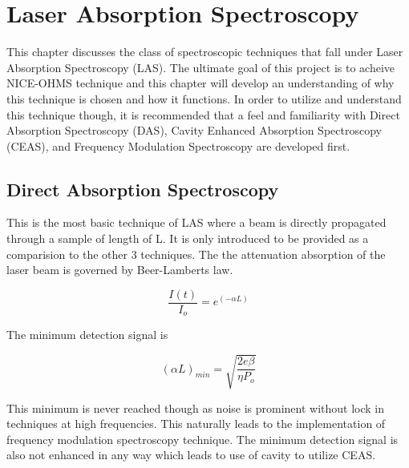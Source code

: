 \documentclass[11pt,a4paper]{book}
\begin{document}
\chapter{Laser Absorption Spectroscopy}
	\label{sec:Laser Absorption Spectroscopy}
	This chapter discusses the class of spectroscopic techniques that fall under Laser Absorption Spectroscopy (LAS). The ultimate goal of this project is to acheive NICE-OHMS technique and this chapter will develop an understanding of why this technique is chosen and how it functions. In order to utilize and understand this technique though, it is recommended that a feel and familiarity with Direct Absorption Spectroscopy (DAS), Cavity Enhanced Absorption Spectroscopy (CEAS), and Frequency Modulation Spectroscopy are developed first.	

	\section{Direct Absorption Spectroscopy}
	
	\label{sec:Direct Absorption Spectroscopy}
		This is the most basic technique of LAS where a beam is directly propagated through a sample of length of L. It is only introduced to be provided as a comparision to the other 3 techniques. The the attenuation absorption of the laser beam is governed by Beer-Lamberts law.

		\begin{equation}
			\label{eq:BeerLamberts}
			\dfrac{I(t)}{I_o} = e^{(-\alpha L)}
		\end{equation}
		
		\noindent
		The minimum detection signal is \cite{NICE-OHMS}
		
		\begin{equation}
			\label{eq:DASlimit}
			(\alpha L)_{min} = \sqrt{\dfrac{2e \beta}{ \eta P_o}}
		\end{equation}
		
		This minimum is never reached though as noise is prominent without lock in techniques at high frequencies. This naturally leads to the implementation of frequency modulation spectroscopy technique. The minimum detection signal is also not enhanced in any way which leads to use of cavity to utilize CEAS. 
		
\end{document}
